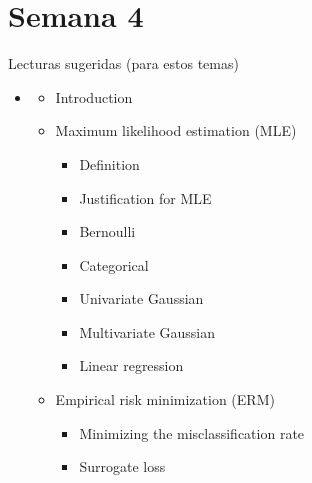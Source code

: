 \part{Semana 4}

\begin{frame}
  \titlepage
\end{frame}

\begin{frame}{Lecturas sugeridas (para estos temas)}
\begin{itemize}
  \item {}
  \begin{itemize}
    \item {} Introduction
    \item {} Maximum likelihood estimation (MLE)
    \begin{itemize}
      \item {} Definition
      \item {} Justification for MLE
      \item {} Bernoulli
      \item {} Categorical
      \item {} Univariate Gaussian
      \item {} Multivariate Gaussian
      \item {} Linear regression 
    \end{itemize}
    \item {} Empirical risk minimization (ERM)
    \begin{itemize}
      \item {} Minimizing the misclassification rate
      \item {} Surrogate loss
    \end{itemize}
  \end{itemize}
\end{itemize}
\end{frame}

